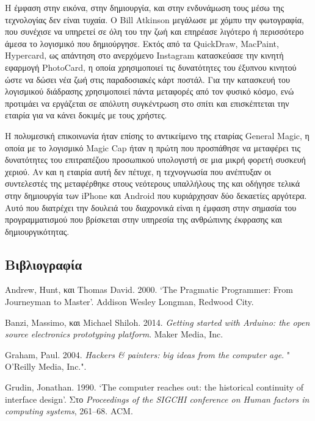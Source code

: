 \documentclass[
]{article}
\newlength{\cslhangindent}
\newlength{\cslentryspacingunit} %
\newenvironment{CSLReferences}[2] %
 {%
  \setlength{\parindent}{0pt}
  \ifodd #1
  \let\oldpar\par
  \def\par{\hangindent=\cslhangindent\oldpar}
  \fi
  \setlength{\parskip}{#2\cslentryspacingunit}
 }%
 {}
\begin{document}
Η έμφαση στην εικόνα, στην δημιουργία, και στην ενδυνάμωση τους μέσω της
τεχνολογίας δεν είναι τυχαία. Ο Bill Atkinson μεγάλωσε με χόμπυ την
φωτογραφία, που συνέχισε να υπηρετεί σε όλη του την ζωή και επηρέασε
λιγότερο ή περισσότερο άμεσα το λογισμικό που δημιούργησε. Εκτός από τα
QuickDraw, MacPaint, Hypercard, ως απάντηση στο ανερχόμενο Instagram
κατασκεύασε την κινητή εφαρμογή PhotoCard, η οποία χρησιμοποιεί τις
δυνατότητες του έξυπνου κινητού ώστε να δώσει νέα ζωή στις παραδοσιακές
κάρτ ποστάλ. Για την κατασκευή του λογισμικού διάδρασης χρησιμοποιεί
πάντα μεταφορές από τον φυσικό κόσμο, ενώ προτιμάει να εργάζεται σε
απόλυτη συγκέντρωση στο σπίτι και επισκέπτεται την εταιρία για να κάνει
δοκιμές με τους χρήστες.

Η πολυμεσική επικοινωνία ήταν επίσης το αντικείμενο της εταιρίας General
Magic, η οποία με το λογισμικό Magic Cap ήταν η πρώτη που προσπάθησε να
μεταφέρει τις δυνατότητες του επιτραπέζιου προσωπικού υπολογιστή σε μια
μικρή φορετή συσκευή χεριού. Αν και η εταιρία αυτή δεν πέτυχε, η
τεχνογνωσία που ανέπτυξαν οι συντελεστές της μεταφέρθηκε στους νεότερους
υπαλλήλους της και οδήγησε τελικά στην δημιουργία των iPhone και Android
που κυριάρχησαν δύο δεκαετίες αργότερα. Αυτό που διατρέχει την δουλειά
του διαχρονικά είναι η έμφαση στην σημασία του προγραμματισμού που
βρίσκεται στην υπηρεσία της ανθρώπινης έκφρασης και δημιουργικότητας.

\hypertarget{ux3b2ux3b9ux3b2ux3bbux3b9ux3bfux3b3ux3c1ux3b1ux3c6ux3afux3b1}{%
\subsection*{Βιβλιογραφία}\label{ux3b2ux3b9ux3b2ux3bbux3b9ux3bfux3b3ux3c1ux3b1ux3c6ux3afux3b1}}

\hypertarget{refs}{}
\begin{CSLReferences}{0}{0}
\end{CSLReferences}

Andrew, Hunt, και Thomas David. 2000. {`The Pragmatic Programmer: From
Journeyman to Master'}. Addison Wesley Longman, Redwood City.

Banzi, Massimo, και Michael Shiloh. 2014. \emph{Getting started with
Arduino: the open source electronics prototyping platform}. Maker Media,
Inc.

Graham, Paul. 2004. \emph{Hackers \& painters: big ideas from the
computer age}. " O'Reilly Media, Inc.".

Grudin, Jonathan. 1990. {`The computer reaches out: the historical
continuity of interface design'}. Στο \emph{Proceedings of the SIGCHI
conference on Human factors in computing systems}, 261--68. ACM.
\end{document}
